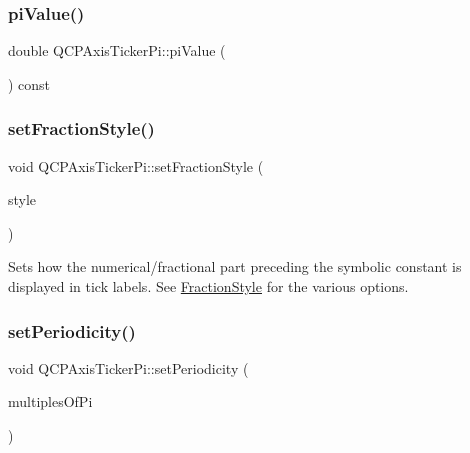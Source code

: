 \mbox{\label{class_q_c_p_axis_ticker_pi_abddc18799caa4ae6c721e1e5e229b3a4}} 
\subsubsection{\texorpdfstring{piValue()}{piValue()}}
{\footnotesize\ttfamily double Q\+C\+P\+Axis\+Ticker\+Pi\+::pi\+Value (\begin{DoxyParamCaption}{ }\end{DoxyParamCaption}) const\hspace{0.3cm}{\ttfamily [inline]}}

\mbox{\label{class_q_c_p_axis_ticker_pi_a760c8af6ca68178e607556c4e5049d71}} 
\subsubsection{\texorpdfstring{setFractionStyle()}{setFractionStyle()}}
{\footnotesize\ttfamily void Q\+C\+P\+Axis\+Ticker\+Pi\+::set\+Fraction\+Style (\begin{DoxyParamCaption}\item[{\mbox{\hyperlink{class_q_c_p_axis_ticker_pi_a262f1534c7f0c79a7d5237f5d1e2c54c}{Q\+C\+P\+Axis\+Ticker\+Pi\+::\+Fraction\+Style}}}]{style }\end{DoxyParamCaption})}

Sets how the numerical/fractional part preceding the symbolic constant is displayed in tick labels. See \mbox{\hyperlink{class_q_c_p_axis_ticker_pi_a262f1534c7f0c79a7d5237f5d1e2c54c}{Fraction\+Style}} for the various options. \mbox{\label{class_q_c_p_axis_ticker_pi_a58f538dc01860fb56e46970e28a87f03}} 
\subsubsection{\texorpdfstring{setPeriodicity()}{setPeriodicity()}}
{\footnotesize\ttfamily void Q\+C\+P\+Axis\+Ticker\+Pi\+::set\+Periodicity (\begin{DoxyParamCaption}\item[{int}]{multiples\+Of\+Pi }\end{DoxyParamCaption})}

